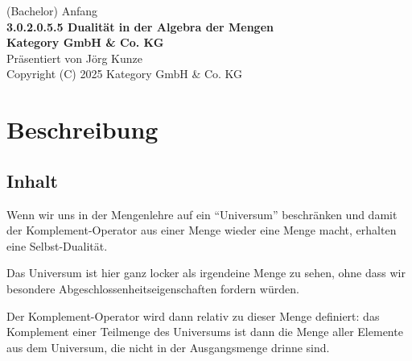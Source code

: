 \documentclass[a4paper]{amsart}
\theoremstyle{definition}
\begin{document}
\begin{titlepage}
\centering
{\huge
(Bachelor) Anfang\\[1cm]
\textbf{3.0.2.0.5.5 Dualität in der Algebra der Mengen}
}\\[1cm]

\textbf{Kategory GmbH \& Co. KG}\\
Präsentiert von Jörg Kunze\\
Copyright (C) 2025 Kategory GmbH \& Co. KG

\end{titlepage}

%

\newpage

\section*{Beschreibung}

\subsection*{Inhalt}
Wenn wir uns in der Mengenlehre auf ein "`Universum"' beschränken und damit der Komplement-Operator aus einer Menge wieder eine Menge macht, erhalten eine Selbst-Dualität.

Das Universum ist hier ganz locker als irgendeine Menge zu sehen, ohne dass wir besondere Abgeschlossenheitseigenschaften fordern würden.

Der Komplement-Operator wird dann relativ zu dieser Menge definiert: das Komplement einer Teilmenge des Universums ist dann die Menge aller Elemente aus dem Universum, die nicht in der Ausgangsmenge drinne sind.
\end{document}
